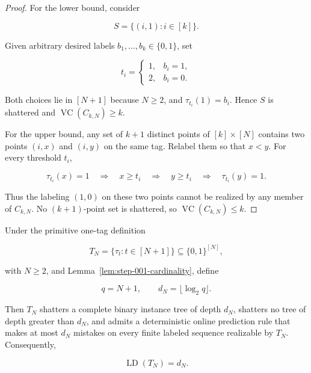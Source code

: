\begin{proof}
For the lower bound, consider

\[
S=\{(i,1):i\in[k]\}.
\]

Given arbitrary desired labels \(b_1,\ldots,b_k\in\{0,1\}\), set

\[
t_i=\begin{cases}
1,&b_i=1,\\
2,&b_i=0.
\end{cases}
\]

Both choices lie in \([N+1]\) because \(N\ge2\), and \(\tau_{t_i}(1)=b_i\). Hence \(S\) is shattered and \(\operatorname{VC}(C_{k,N})\ge k\).

For the upper bound, any set of \(k+1\) distinct points of \([k]\times[N]\) contains two points \((i,x)\) and \((i,y)\) on the same tag. Relabel them so that \(x<y\). For every threshold \(t_i\),

\[
\tau_{t_i}(x)=1\quad\Longrightarrow\quad x\ge t_i
\quad\Longrightarrow\quad y\ge t_i
\quad\Longrightarrow\quad \tau_{t_i}(y)=1.
\]

Thus the labeling \((1,0)\) on these two points cannot be realized by any member of \(C_{k,N}\). No \((k+1)\)-point set is shattered, so \(\operatorname{VC}(C_{k,N})\le k\). \end{proof}

\begin{lemma}\label{lem:step-001-one-tag-ld}
Under the primitive one-tag definition

\[
T_N=\{\tau_t:t\in[N+1]\}\subseteq\{0,1\}^{[N]},
\]

with \(N\ge2\), and Lemma~\ref{lem:step-001-cardinality}, define

\[
q=N+1,\qquad d_N=\lfloor\log_2 q\rfloor.
\]

Then \(T_N\) shatters a complete binary instance tree of depth \(d_N\), shatters no tree of depth greater than \(d_N\), and admits a deterministic online prediction rule that makes at most \(d_N\) mistakes on every finite labeled sequence realizable by \(T_N\). Consequently,

\[
\operatorname{LD}(T_N)=d_N.
\]
\end{lemma}

